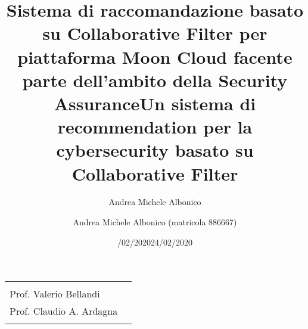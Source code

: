 \documentclass[10pt,a4paper]{article}
\title{Sistema di raccomandazione basato su Collaborative Filter per piattaforma Moon Cloud 
facente parte dell'ambito della Security Assurance}
\author{Andrea Michele Albonico}
\date{/02/2020}
\begin{document}
\title{\textbf{Un sistema di recommendation per la cybersecurity basato su Collaborative Filter}}
\author{Andrea Michele Albonico (matricola 886667)}
\date{24/02/2020}

\maketitle

\vspace{0.5 cm}

\begin{minipage}{\linewidth}
    \begin{tabular}{l r}
        \begin{minipage}[t]{.4\linewidth}
            \begin{flushleft}
                {
                    RELATORE\\[.15cm]
                    Prof. Valerio Bellandi
                }
            \end{flushleft}
        \end{minipage}
        &
        \begin{minipage}[t]{.53\linewidth}
            \begin{flushright}
                {
                    CORRELATORE\\[.15cm]
                    Prof. Claudio A. Ardagna\\[.1cm]
                }
            \end{flushright}
        \end{minipage}
    \end{tabular}
\end{minipage}

\vspace{2 cm}
\end{document}
